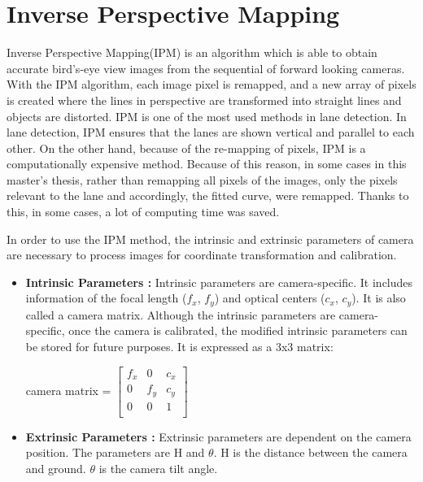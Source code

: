 %
\section{Inverse Perspective Mapping}\label{sec:Inverse Perspective Mapping}
%
Inverse Perspective Mapping(IPM) is an algorithm which is able to obtain accurate bird's-eye view images from the sequential of forward looking cameras. With the IPM algorithm, each image pixel is remapped, and a new array of pixels is created where the lines in perspective are transformed into straight lines and objects are distorted. IPM is one of the most used methods in lane detection. In lane detection, IPM ensures that the lanes are shown vertical and parallel to each other. On the other hand, because of the re-mapping of pixels, IPM is a computationally expensive method. Because of this reason, in some cases in this master's thesis, rather than remapping all pixels of the images, only the pixels relevant to the lane and accordingly, the fitted curve, were remapped. Thanks to this, in some cases, a lot of computing time was saved.

In order to use the IPM method, the intrinsic and extrinsic parameters of camera are necessary to process images for coordinate transformation and calibration.

\begin{itemize}

\item \textbf{Intrinsic Parameters :} Intrinsic parameters are camera-specific. It includes
information of the focal length ($f_x$, $f_y$) and optical centers ($c_x$, $c_y$). It is also called a camera matrix. Although the intrinsic parameters are camera-specific, once the camera is calibrated, the modified intrinsic parameters can be stored for future purposes. It is expressed as a 3x3 matrix:

 \begin{center}
  camera matrix =  $
 \begin{bmatrix} 
f_x & 0 & c_x \\
0 & f_y & c_y \\
0 & 0 & 1 \\
\end{bmatrix}
$  \end{center}

\item \textbf{Extrinsic Parameters :} Extrinsic parameters are dependent on the camera position. The parameters are H and $\theta$. H is the distance between the camera and ground. $\theta$ is the camera tilt angle. 
 
\end{itemize}
  
